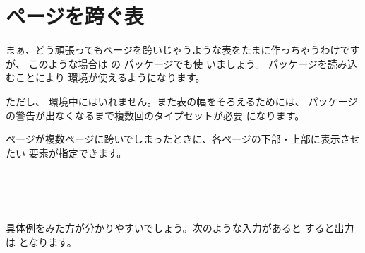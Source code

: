 \section{ページを跨ぐ表\texorpdfstring{\zdash}{---}}
まぁ、どう頑張ってもページを跨いじゃうような表をたまに作っちゃうわけですが、
このような場合は の  パッケージでも使
いましょう。  パッケージを読み込むことにより 
環境が使えるようになります。

ただし、  環境中にはいれません。また表の幅をそろえるためには、
パッケージの警告が出なくなるまで複数回のタイプセットが必要
になります。

ページが複数ページに跨いでしまったときに、各ページの下部・上部に表示させたい
要素が指定できます。
\begin{Syntax}
 \\
 \\
 \\
 
\end{Syntax}
具体例をみた方が分かりやすいでしょう。次のような入力があると
すると出力は  となります。
